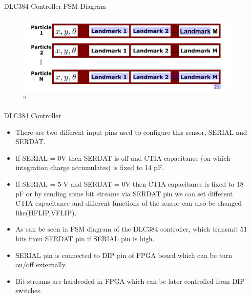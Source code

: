 \documentclass{beamer}
\begin{document}
\begin{frame}{DLC384 Controller FSM Diagram}
    \begin{figure}
        \centering
        \includegraphics[width=\textwidth]{RBPF_SLAM.png}$^{9}$
    \end{figure}
\end{frame}


\begin{frame}{DLC384 Controller}
    \begin{itemize}
        \item There are two different input pins used to configure this sensor, SERIAL and SERDAT.
        \item If SERIAL = 0V then SERDAT is off and CTIA capacitance (on which integration charge accumulates) is fixed to 14 pF.
        \item If SERIAL = 5 V and SERDAT = 0V then CTIA capacitance is fixed to 18 pF or by sending some bit streams via SERDAT pin we can set different CTIA capacitance and different functions of the sensor can also be changed like(HFLIP,VFLIP).
        \item As can be seen in FSM diagram of the DLC384 controller, which transmit 51 bits from SERDAT pin if SERIAL pin is high.
        \item SERIAL pin is connected to DIP pin of FPGA board which can be turn on/off externally.
        \item Bit streams are hardcoded in FPGA which can be later controlled from DIP switches.
    \end{itemize}
\end{frame}
\end{document}
